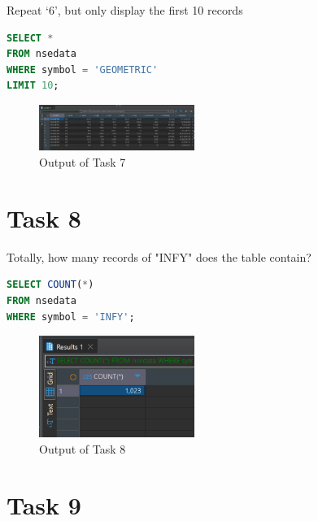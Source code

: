\documentclass{article}
\begin{document}
\begin{task*}[7]
Repeat `6', but only display the first 10 records
\end{task*}

\begin{lstlisting}[language=SQL, caption=Displaying the First 10 Records for GEOMETRIC]
SELECT *
FROM nsedata
WHERE symbol = 'GEOMETRIC' 
LIMIT 10;
\end{lstlisting}

\begin{figure}[H]
	\centering
	\includegraphics[width=0.45\textwidth]{Images/Task7.png}
	\caption{Output of Task 7}
\end{figure}

\clearpage

\section*{Task 8}

\begin{task*}[8]
Totally, how many records of "INFY" does the table contain?
\end{task*}

\begin{lstlisting}[language=SQL, caption=Counting the Total Number of Records for INFY]
SELECT COUNT(*)
FROM nsedata
WHERE symbol = 'INFY';
\end{lstlisting}

\begin{figure}[H]
	\centering
	\includegraphics[width=0.45\textwidth]{Images/Task8.png}
	\caption{Output of Task 8}
\end{figure}

\section*{Task 9}
\end{document}
